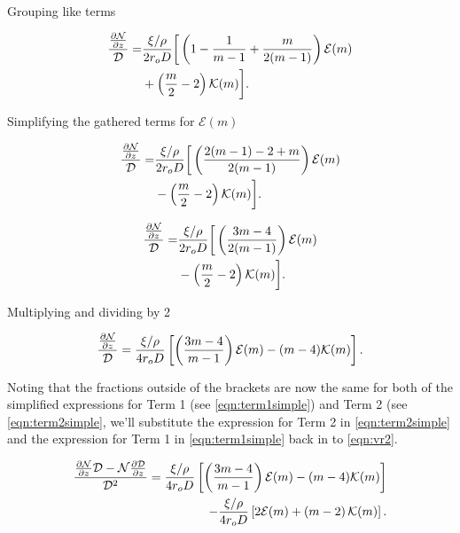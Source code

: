 \noindent Grouping like terms

\begin{equation}
    \begin{split}
        \frac{\frac{\partial \mathcal{N}}{\partial z}}{\mathcal{D}} =& \frac{\xi/\rho}{2r_o D} \bigg[ \left(1- \frac{1}{m-1}+ \frac{m}{2(m-1)} \right)\mathcal{E}(m) \\
         &+ \left(\frac{m}{2}-2\right)\mathcal{K}(m) \bigg].
\end{split}
\end{equation}

\noindent Simplifying the gathered terms for \(\mathcal{E}(m)\)

\begin{equation}
    \begin{split}
        \frac{\frac{\partial \mathcal{N}}{\partial z}}{\mathcal{D}} =& \frac{\xi/\rho}{2r_o D} \bigg[ \left(\frac{2(m-1)- 2+ m}{2(m-1)} \right)\mathcal{E}(m) \\
         &- \left(\frac{m}{2}-2\right)\mathcal{K}(m) \bigg].
\end{split}
\end{equation}

\begin{equation}
    \begin{split}
        \frac{\frac{\partial \mathcal{N}}{\partial z}}{\mathcal{D}} =& \frac{\xi/\rho}{2r_o D} \bigg[ \left(\frac{3m-4}{2(m-1)} \right)\mathcal{E}(m) \\
         &- \left(\frac{m}{2}-2\right)\mathcal{K}(m) \bigg].
\end{split}
\end{equation}

\noindent Multiplying and dividing by 2

\begin{equation}
    \label{eqn:term1simple}
        \frac{\frac{\partial \mathcal{N}}{\partial z}}{\mathcal{D}} = \frac{\xi/\rho}{4 r_o D} \left[ \left(\frac{3m-4}{m-1} \right)\mathcal{E}(m) - (m-4)\mathcal{K}(m) \right].
\end{equation}

Noting that the fractions outside of the brackets are now the same for both of the simplified expressions for Term 1 (see \cref{eqn:term1simple}) and Term 2 (see \cref{eqn:term2simple}, we'll substitute the expression for Term 2 in \cref{eqn:term2simple} and the expression for Term 1 in \cref{eqn:term1simple} back in to \cref{eqn:vr2}.
%

\begin{equation}
    \begin{split}
\frac{\frac{\partial \mathcal{N}}{\partial z}\mathcal{D} - \mathcal{N}\frac{\partial \mathcal{D}}{\partial z}}{\mathcal{D}^2} = \frac{\xi/\rho}{4 r_o D} \left[ \left(\frac{3m-4}{m-1} \right)\mathcal{E}(m) - (m-4)\mathcal{K}(m) \right] \\
        - \frac{\xi/\rho }{4 r_o D} \left[ 2\mathcal{E}(m) + \left(m - 2 \right)\mathcal{K}(m) \right].
    \end{split}
\end{equation}

